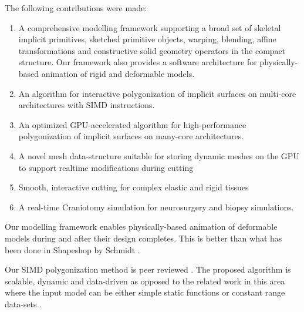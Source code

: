 \label{chapter:conclusion}
The following contributions were made:


\begin{enumerate}
  
\item A comprehensive modelling framework supporting a broad set of skeletal implicit primitives, 
 sketched primitive objects, warping, blending, affine transformations and constructive solid geometry 
 operators in the compact \blob structure. Our framework also provides a software architecture for 
 physically-based animation of rigid and deformable models.
 
 \item An algorithm for interactive polygonization of implicit surfaces on multi-core architectures with 
 SIMD instructions. 
 
 \item An optimized GPU-accelerated algorithm for high-performance polygonization of implicit surfaces 
 on many-core architectures. 
 
 \item A novel mesh data-structure suitable for storing dynamic meshes on the GPU to support realtime 
 modifications during cutting
 
 \item Smooth, interactive cutting for complex elastic and rigid tissues 
 
 
\item A real-time Craniotomy simulation for neurosurgery and biopsy simulations.

\end{enumerate} 

Our modelling framework enables physically-based animation of deformable models 
during and after their design completes. This is better than what has been done 
in Shapeshop by Schmidt \etal \cite{Schmidt2006b}.  

Our SIMD polygonization method is peer reviewed \cite{Shirazian2012}. 
The proposed algorithm is scalable, dynamic and data-driven as opposed to the related work in this 
area where the input model can be either simple static functions or constant range data-sets 
\cite{Johansson2006, Tatarchuk2007, Knoll2007, Yang2010}.

